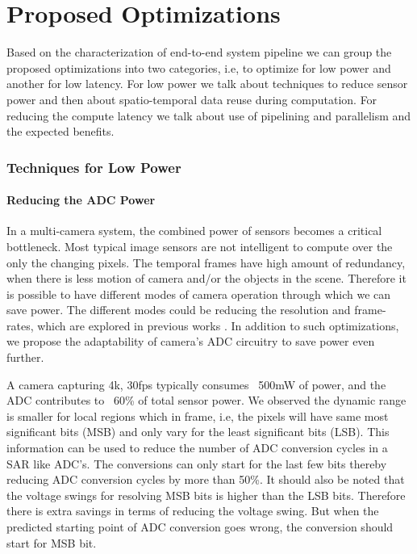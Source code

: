 \chapter{Proposed Optimizations}
\label{chap:PropOpt}
Based on the characterization of end-to-end system pipeline we can group the proposed optimizations into two categories, i.e, to optimize for low power and another for low latency. For low power we talk about techniques to reduce sensor power and then about spatio-temporal data reuse during computation. For reducing the compute latency we talk about use of pipelining and parallelism and the expected benefits. 

\subsection{Techniques for Low Power}

\subsubsection{Reducing the ADC Power}
In a multi-camera system, the combined power of sensors becomes a critical bottleneck. Most typical image sensors are not intelligent to compute over the only the changing pixels. The temporal frames have high amount of redundancy, when there is less motion of camera and/or the objects in the scene. Therefore it is possible to have different modes of camera operation through which we can save power. The different modes could be reducing the resolution and frame-rates, which are explored in previous works \cite{hu2018characterizing}. In addition to such optimizations, we propose the adaptability of camera's ADC circuitry to save power even further. 

A camera capturing 4k, 30fps typically consumes ~500mW of power, and the ADC contributes to ~60\% of total sensor power. We observed the dynamic range is smaller for local regions which in frame, i.e, the pixels will have same most significant bits (MSB) and only vary for the least significant bits (LSB). This information can be used to reduce the number of ADC conversion cycles in a SAR like ADC's. The conversions can only start for the last few bits thereby reducing ADC conversion cycles by more than 50\%. It should also be noted that the voltage swings for resolving MSB bits is higher than the LSB bits. Therefore there is extra savings in terms of reducing the voltage swing. But when the predicted starting point of ADC conversion goes wrong, the conversion should start for MSB bit. 

